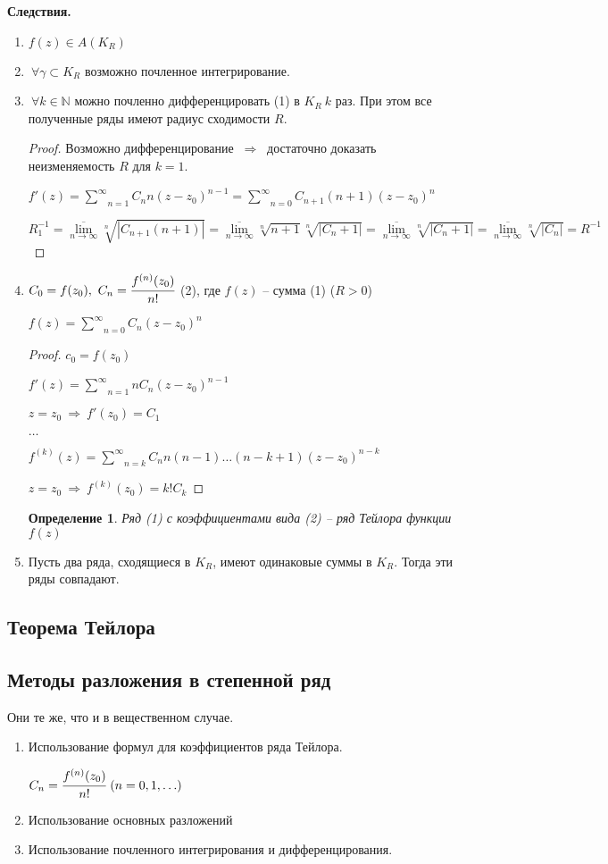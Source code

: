 \documentclass[draft]{report}
\newcommand{\then}{\ \Rightarrow\ }
\newcommand{\N}{\mathbb{N}}
\newcommand{\msum}[2]{\underset{#1}{\overset{#2}{\sum}}}
\newcommand{\rsum}{\msum{n=1}{\infty}}
\newcommand{\ssum}{\msum{n=0}{\infty}}
\newcommand{\mlim}[1]{\underset{#1}{\lim}}
\newcommand{\g}{\gamma}
\newcommand{\F}{\ \forall}
\newcommand{\opr}[1]{\begin{opred}#1\end{opred}}
\newtheorem*{opred}{Определение}
\theoremstyle{remark}
\begin{document}
{\bfseries Следствия.}
\begin{enumerate}
\item $f(z)\in A(K_R)$
\item $\F\g\subset K_R$ возможно почленное интегрирование.
\item $\F k\in\N$ можно почленно дифференцировать (1) в $K_R\ k$ раз. При этом все полученные ряды имеют радиус сходимости $R$.
\begin{proof}
Возможно дифференцирование $\then$ достаточно доказать неизменяемость $R$ для $k=1$.

$f'(z)=\rsum C_n n(z-z_0)^{n-1}=\ssum C_{n+1}(n+1)(z-z_0)^n$

$R^{-1}_1=\overline{\mlim{n\to\infty}}\sqrt[n]{|C_{n+1}(n+1)|}=\overline{\mlim{n\to\infty}}\sqrt[n]{n+1}\sqrt[n]{|C_n+1|}=\overline{\mlim{n\to\infty}}\sqrt[n]{|C_n+1|}=\overline{\mlim{n\to\infty}}\sqrt[n]{|C_n|}=R^{-1}$
\end{proof}
\item $C_0=f(z_0),\ C_n=\cfrac{f^{(n)}(z_0)}{n!}$ (2), где $f(z)$ -- сумма (1) ($R>0$)

$f(z)=\ssum C_n(z-z_0)^n$
\begin{proof}
$c_0=f(z_0)$

$f'(z)=\rsum nC_n(z-z_0)^{n-1}$

$z=z_0\then f'(z_0)=C_1$

$\ldots$

$f^{(k)}(z)=\msum{n=k}{\infty}C_nn(n-1)\ldots(n-k+1)(z-z_0)^{n-k}$

$z=z_0\then f^{(k)}(z_0)=k!C_k$
\end{proof}
\opr{Ряд (1) с коэффициентами вида (2) -- ряд Тейлора функции $f(z)$}
\item Пусть два ряда, сходящиеся в $K_R$, имеют одинаковые суммы в $K_R$. Тогда эти ряды совпадают.
\end{enumerate}

\subsection{Теорема Тейлора}

\subsection{Методы разложения в степенной ряд}

Они те же, что и в вещественном случае.
\begin{enumerate}
\item Использование формул для коэффициентов ряда Тейлора.

$C_n=\cfrac{f^{(n)}(z_0)}{n!}\ (n=0,1,\ldots)$
\item Использование основных разложений
\item Использование почленного интегрирования и дифференцирования.
\end{enumerate}
\end{document}
